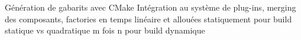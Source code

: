 \begin{block}{Génération de gabarits avec CMake}
Intégration au système de plug-ins, merging des composants, factories en temps linéaire et allouées statiquement pour build statique vs quadratique m fois n pour build dynamique
\end{block}